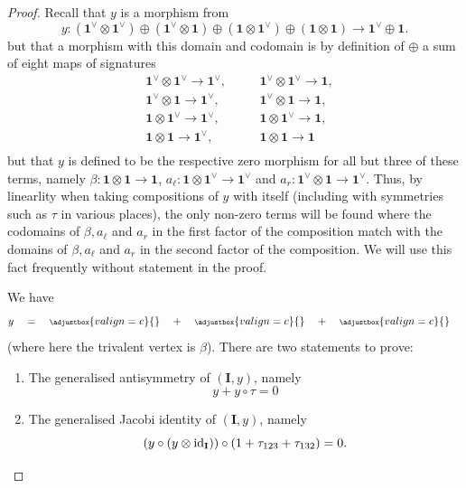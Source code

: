 \begin{proof}
	Recall that \(y\) is a morphism from
	\[
	y
	:
	(\mathbf{1}^{\vee} \otimes \mathbf{1}^{\vee})
	\oplus
	(\mathbf{1}^{\vee} \otimes \mathbf{1})
	\oplus
	(\mathbf{1} \otimes \mathbf{1}^{\vee})
	\oplus
	(\mathbf{1} \otimes \mathbf{1})
	\longrightarrow
	\mathbf{1}^{\vee} \oplus \mathbf{1}
	.
	\]
	but that a morphism with this domain and codomain is by definition of \(\oplus\) a sum of eight maps of signatures
	\begin{align*}
		&
		\mathbf{1}^{\vee} \otimes \mathbf{1}^{\vee} \to \mathbf{1}^{\vee}, \quad
		&&
		\mathbf{1}^{\vee} \otimes \mathbf{1}^{\vee} \to \mathbf{1},
		\\
		&
		\mathbf{1}^{\vee} \otimes \mathbf{1} \to \mathbf{1}^{\vee}, \quad
		&&
		\mathbf{1}^{\vee} \otimes \mathbf{1} \to \mathbf{1},
		\\
		&
		\mathbf{1} \otimes \mathbf{1}^{\vee} \to \mathbf{1}^{\vee}, \quad
		&&
		\mathbf{1} \otimes \mathbf{1}^{\vee} \to \mathbf{1},
		\\
		&
		\mathbf{1} \otimes \mathbf{1} \to \mathbf{1}^{\vee}, \quad
		&&
		\mathbf{1} \otimes \mathbf{1} \to \mathbf{1}
		\\
	\end{align*}
	but that \(y\) is defined to be the respective zero morphism for all but three of these terms, namely \(\beta: \mathbf{1} \otimes \mathbf{1} \to \mathbf{1}\), \(a_{\ell}: \mathbf{1} \otimes \mathbf{1}^{\vee} \to \mathbf{1}^{\vee}\) and \(a_{r}: \mathbf{1}^{\vee} \otimes \mathbf{1} \to \mathbf{1}^{\vee}\). Thus, by linearlity when taking compositions of \(y\) with itself (including with symmetries such as \(\tau\) in various places), the only non-zero terms will be found where the codomains of \(\beta, a_{\ell}\) and \(a_{r}\) in the first factor of the composition match with the domains of \(\beta, a_{\ell}\) and \(a_{r}\) in the second factor of the composition. We will use this fact frequently without statement in the proof.

	We have
	\[
		y
		\quad
		=
		\quad
		{\scriptsize
		\def\svgscale{0.38}
		\adjustbox{valign=c}{}
		}
		\quad
		+
		\quad
		{\scriptsize
		\def\svgscale{0.38}
		\adjustbox{valign=c}{}
		}
		\quad
		+
		\quad
		{\scriptsize
		\def\svgscale{0.38}
		\adjustbox{valign=c}{}
		}
		\quad
	\]
	(where here the trivalent vertex is \(\beta\)). There are two statements to prove:
	\begin{enumerate}
		\item
			\label{prf:generalised-antisymmetry-y}
			The generalised antisymmetry of \((\mathbf{I}, y)\), namely
			\[y + y \circ \tau = 0\]
		\item
			\label{prf:generalised-jacobi-y}
			The generalised Jacobi identity of \((\mathbf{I}, y)\), namely
			\[(y \circ (y \otimes \mathrm{id}_{\mathbf{I}})) \circ (1 + \tau_{123} + \tau_{132}) = 0.\]
	\end{enumerate}


\end{proof}

